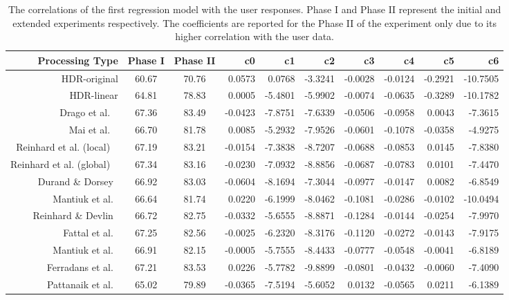 \begin{landscape}
\begin{table}
\caption{The correlations of the first regression model with the user responses. Phase I and Phase II represent the initial and extended experiments respectively. The coefficients are reported for the Phase II of the experiment only due to its higher correlation with the user data.}
\centering
\begin{tabular}{r|c c || r r r r r r r}
\label{tab:correlation_triplet_model}
\textbf{Processing Type} & \textbf{Phase I} & \textbf{Phase II} & \textbf{c0} & \textbf{c1} & \textbf{c2} & \textbf{c3} & 
\textbf{c4} & \textbf{c5} & \textbf{c6}\\
\hline
HDR-original & 60.67 & 70.76 & 0.0573 & 0.0768 & -3.3241 & -0.0028 & -0.0124 & -0.2921 & -10.7505 \\
HDR-linear & 64.81 & 78.83 & 0.0005 & -5.4801 & -5.9902 & -0.0074 & -0.0635 & -0.3289 & -10.1782 \\
Drago et al. ~\cite{drago2003adaptive} & 67.36 & 83.49 & -0.0423 & -7.8751 & -7.6339 & -0.0506 & -0.0958 & 0.0043 & -7.3615 \\
Mai et al. ~\cite{mai2011subjective} & 66.70 & 81.78 & 0.0085 & -5.2932 & -7.9526 & -0.0601 & -0.1078 & -0.0358 & -4.9275 \\
Reinhard et al. (local) ~\cite{reinhard2002photographic} & 67.19 & 83.21 & -0.0154 & -7.3838 & -8.7207 & -0.0688 & -0.0853 & 0.0145 & -7.8380 \\
Reinhard et al. (global) ~\cite{reinhard2002photographic} & 67.34 & 83.16 & -0.0230 & -7.0932 & -8.8856 & -0.0687 & -0.0783 & 0.0101 & -7.4470 \\
Durand \& Dorsey~\cite{durand2002fast} & 66.92 & 83.03 & -0.0604 & -8.1694 & -7.3044 & -0.0977 & -0.0147 & 0.0082 & -6.8549 \\
Mantiuk et al.~\cite{mantiuk2006backward} & 66.64 & 81.74 & 0.0220 & -6.1999 & -8.0462 & -0.1081 & -0.0286 & -0.0102 & -10.0494 \\
Reinhard \& Devlin~\cite{reinhard2005dynamic} & 66.72 & 82.75 & -0.0332 & -5.6555 & -8.8871 & -0.1284 & -0.0144 & -0.0254 & -7.9970 \\
Fattal et al.~\cite{durand2002fast} & 67.25 & 82.56 & -0.0025 & -6.2320 & -8.3176 & -0.1120 & -0.0272 & -0.0143 & -7.9175 \\
Mantiuk et al.~\cite{mantiuk2008modeling} & 66.91 & 82.15 & -0.0005 & -5.7555 & -8.4433 & -0.0777 & -0.0548 & -0.0041 & -6.8189 \\
Ferradans et al.~\cite{ferradans2011analysis} & 67.21 & 83.53 & 0.0226 & -5.7782 & -9.8899 & -0.0801 & -0.0432 & -0.0060 & -7.4090 \\
Pattanaik et al.~\cite{pattanaik2000time} & 65.02 & 79.89 & -0.0365 & -7.5194 & -5.6052 & 0.0132 & -0.0565 & 0.0211 & -6.1389 \\
\end{tabular}
\end{table}
\end{landscape}


